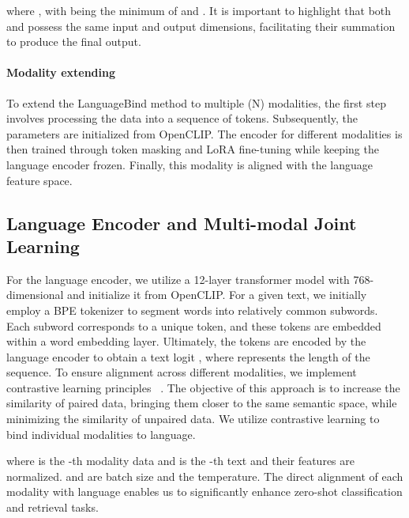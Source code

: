 \documentclass{article} \usepackage{iclr2024_conference,times}
\begin{document}
where , with  being the minimum of  and . It is important to highlight that both  and  possess the same input and output dimensions, facilitating their summation to produce the final output.
\paragraph{Modality extending} To extend the LanguageBind method to multiple (N) modalities, the first step involves processing the data into a sequence of tokens. Subsequently, the parameters are initialized from OpenCLIP. The encoder for different modalities is then trained through token masking and LoRA fine-tuning while keeping the language encoder frozen. Finally, this modality is aligned with the language feature space.
 
\subsection{Language Encoder and Multi-modal Joint Learning}
\label{section: Language Encoder and Multi-modal Joint Learning}
For the language encoder, we utilize a 12-layer transformer model with 768-dimensional and initialize it from OpenCLIP. For a given text, we initially employ a BPE tokenizer to segment words into relatively common subwords. Each subword corresponds to a unique token, and these tokens are embedded within a word embedding layer. Ultimately, the tokens are encoded by the language encoder to obtain a text logit , where  represents the length of the sequence. To ensure alignment across different modalities, we implement contrastive learning principles ~\citep{radford2021learning}. The objective of this approach is to increase the similarity of paired data, bringing them closer to the same semantic space, while minimizing the similarity of unpaired data. We utilize contrastive learning to bind individual modalities to language.

where  is the -th modality data and  is the -th text and their features are normalized.  and  are batch size and the temperature. The direct alignment of each modality  with language  enables us to significantly enhance zero-shot classification and retrieval tasks. 
\end{document}
